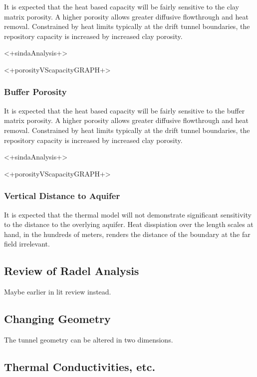 It is expected that the heat based capacity will be fairly sensitive to the 
clay matrix porosity. A higher porosity allows greater diffusive flowthrough and 
heat removal. Constrained by heat limits typically at the drift tunnel
boundaries, the repository capacity is increased by increased clay porosity. 

<+sindaAnalysis+>

<+porosityVScapacityGRAPH+>


\subsubsection{Buffer Porosity}

It is expected that the heat based capacity will be fairly sensitive to the 
buffer matrix porosity. A higher porosity allows greater diffusive flowthrough and 
heat removal. Constrained by heat limits typically at the drift tunnel
boundaries, the repository capacity is increased by increased clay porosity. 

<+sindaAnalysis+>

<+porosityVScapacityGRAPH+>

\subsubsection{Vertical Distance to Aquifer}

It is expected that the thermal model will not demonstrate significant
sensitivity to the distance to the overlying aquifer. Heat disspiation over 
the length scales at hand, in the hundreds of meters, renders the distance of 
the boundary at the far field irrelevant. 



\subsection{Review of Radel Analysis}

Maybe earlier in lit review instead. 

\subsection{Changing Geometry}

The tunnel geometry can be altered in two dimensions.

\subsection{Thermal Conductivities, etc.}

